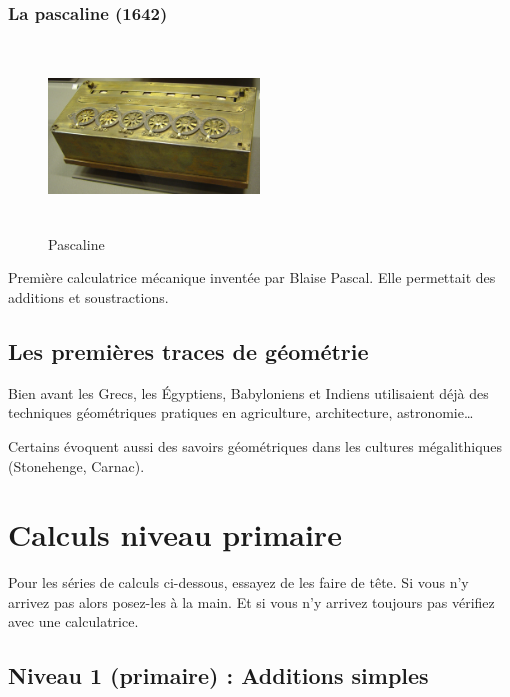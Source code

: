 \documentclass[11pt]{article}
\begin{document}
\subsubsection{La pascaline (1642)}
\label{sec:orgb719f83}

\begin{figure}[htbp]
\centering
\includegraphics[width=0.5\textwidth,height=5cm]{./images/pascaline.jpg}
\caption{Pascaline}
\end{figure}


Première calculatrice mécanique inventée par Blaise Pascal. Elle
permettait des additions et soustractions.


\newpage


\subsection{Les premières traces de géométrie}
\label{sec:org4607487}

Bien avant les Grecs, les Égyptiens, Babyloniens et Indiens
utilisaient déjà des techniques géométriques pratiques en agriculture,
architecture, astronomie\ldots{}


Certains évoquent aussi des savoirs géométriques dans les cultures
mégalithiques (Stonehenge, Carnac).


\newpage


\section{Calculs niveau primaire}
\label{sec:orgd00c16e}


Pour les séries de calculs ci-dessous, essayez de les faire de
tête. Si vous n'y arrivez pas alors posez-les à la main. Et si vous
n'y arrivez toujours pas vérifiez avec une calculatrice.

\newpage


\subsection{Niveau 1 (primaire) : Additions simples}
\label{sec:orgb742e95}
\label{orge2529ac}
\end{document}
